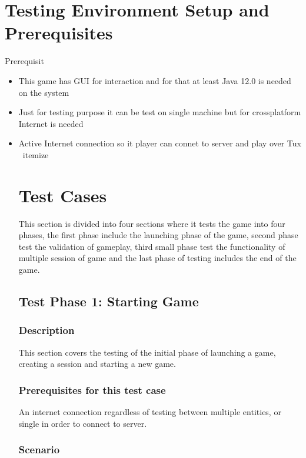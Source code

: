 \documentclass{scrreprt}
\begin{document}
\chapter{Testing Environment Setup and Prerequisites}

Prerequisit
\begin{itemize}
  \item This game has GUI for interaction and for that at least Java 12.0 is needed on the system
  \item Just for testing purpose it can be test on single machine but for crossplatform Internet is needed
  \item Active Internet connection so it player can connet to server and play over Tux
\
{itemize}

\chapter{Test Cases}

This section is divided into four sections where it tests the game into four phases, the first phase include the launching phase of the game,
second phase test the validation of gameplay, third small phase test the functionality of multiple session of game and the last phase of testing includes the end of the game. 

\section{Test Phase 1: Starting Game}

\subsection{Description}
This section covers the testing of the initial phase of launching a game, creating a session and starting a new game.

\subsection{Prerequisites for this test case}
An internet connection regardless of testing between multiple entities, or single in order to connect to server.

\subsection{Scenario}


\end{itemize}
\end{document}

